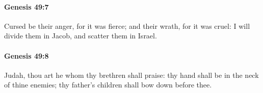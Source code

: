 		\paragraph{Genesis 49:7} %
			\label{GENESIS-49-7}

			Cursed be their anger, for it was fierce; and their wrath, for it was cruel: I will divide them in Jacob, and scatter them in Israel.


		\paragraph{Genesis 49:8} %
			\label{GENESIS-49-8}

			Judah, thou art he whom thy brethren shall praise: thy hand shall be in the neck of thine enemies; thy father's children shall bow down before thee.


